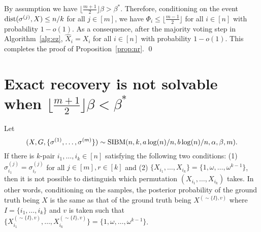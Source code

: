 \documentclass{article}
\begin{document}
By assumption we have $\lfloor \frac{m+1}{2} \rfloor \beta>\beta^\ast$. Therefore, conditioning on the event $\operatorname{dist}(\sigma^{(j)}, X) \le n/k$ for all $j\in[m]$, we have $\Phi_i\le \lfloor \frac{m-1}{2} \rfloor$ for all $i\in[n]$ with probability $1-o(1)$. As a consequence, after the majority voting step in Algorithm~\ref{alg:ez}, $\hat{X}_i=X_i$ for all $i\in[n]$ with probability $1-o(1)$. This completes the proof of Proposition~\ref{prop:nr}.
\hfill\qed
\section{Exact recovery is not solvable when $\lfloor \frac{m+1}{2} \rfloor \beta < \beta^\ast$}\label{sect:converse}

\begin{lemma} \label{lm:qq}
	Let 
	$$
	(X,G,\{\sigma^{(1)},\dots,\sigma^{(m)}\})\sim \operatorname{SIBM}(n,k,a\log(n)/n, b\log(n)/n,\alpha,\beta, m) .
	$$
	If there is $k$-pair $i_1,\dots, i_k\in[n]$ satisfying the following two conditions: (1) $\sigma_{i_1}^{(j)}=\sigma_{i_r}^{(j)}$ for all $j\in[m], r \in[k]$ and (2) $\{X_{i_1}, \dots, X_{i_k}\} = \{1,\omega, \dots, \omega^{k-1} \}$, then it is not possible to distinguish which permutation $(X_{i_1}, \dots, X_{i_k})$ takes. In other words, conditioning on the samples, the posterior probability of the ground truth being $X$ is the same as that of the ground truth being $X^{(\sim\{I\},v)}$ where $I=\{i_1, \dots, i_k\}$ and $v$ is taken such that $\{X^{(\sim\{I\},v)}_{i_1}, \dots, X^{(\sim\{I\},v)}_{i_k}\} = \{1,\omega, \dots, \omega^{k-1} \}$.
\end{lemma}
\end{document}

